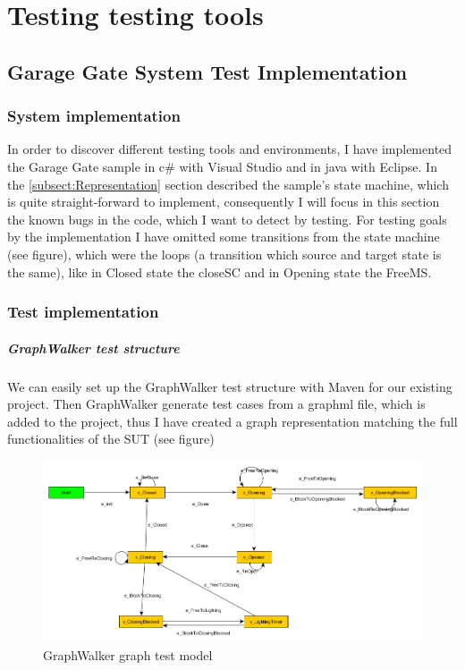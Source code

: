 \chapter{Testing testing tools}\label{chapt:Testing tools}

\section{Garage Gate System Test Implementation}
\subsection{System implementation}
In order to discover different testing tools and environments, I have implemented the Garage Gate sample in c\# with Visual Studio and in java with Eclipse. In the \ref{subsect:Representation} section described the sample's state machine, which is quite straight-forward to implement, consequently I will focus in this section the known bugs in the code, which I want to detect by testing.
For testing goals by the implementation I have omitted some transitions from the state machine (see  figure), which were the loops (a transition which source and target state is the same), like in Closed state the closeSC and in Opening state the FreeMS.

\subsection{Test implementation}
\paragraph{GraphWalker test structure}
We can easily set up the GraphWalker test structure with Maven for our existing project. Then GraphWalker generate test cases from a graphml file, which is added to the project, thus I have created a graph representation matching the full functionalities of the SUT (see  figure)

\begin{figure}[!ht]
	\centering
	\includegraphics[width=150mm, keepaspectratio]{figures/GateModel.png}
	\caption{GraphWalker graph test model}
	\label{fig:GraphWalker-GateModel}
\end{figure}

